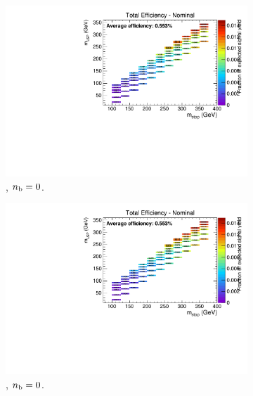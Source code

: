 \begin{figure}[ht!]
  \centering
  \begin{subfigure}[b]{0.32\textwidth}
    \includegraphics[width=\textwidth, page=4]{Figs/sms/t2cc/v24/bTag_T2cc_v24_eq0b_le3j_incl.pdf}
    \caption{\njlow, $n_{\text{b}} = 0$.}
  \end{subfigure}
  \begin{subfigure}[b]{0.32\textwidth}
    \includegraphics[width=\textwidth, page=5]{Figs/sms/t2cc/v24/bTag_T2cc_v24_eq0b_le3j_incl.pdf}
    \caption{\njlow, $n_{\text{b}} = 0$.}
  \end{subfigure}
  \begin{subfigure}[b]{0.32\textwidth}

\end{subfigure}
\end{figure}

